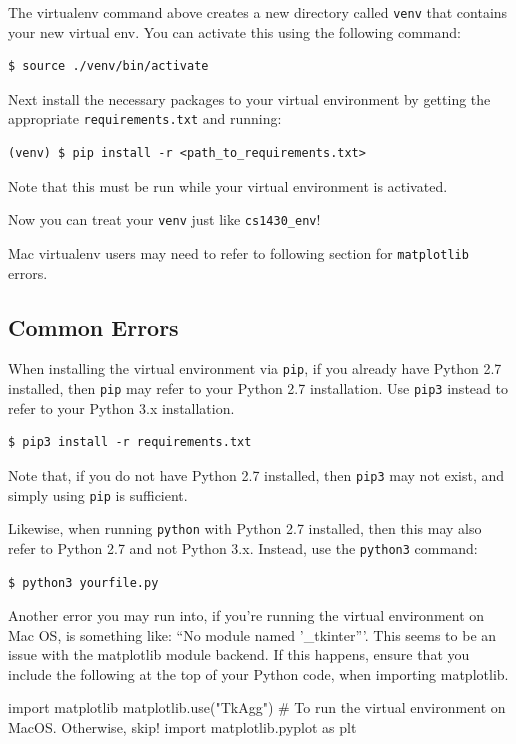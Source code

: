 \documentclass{article}
\begin{document}
The virtualenv command above creates a new directory called \texttt{venv} that contains your new virtual env. You can activate this using the following command:
\begin{verbatim}
$ source ./venv/bin/activate
\end{verbatim}

Next install the necessary packages to your virtual environment by getting the appropriate \texttt{requirements.txt} and running:
\begin{verbatim}
(venv) $ pip install -r <path_to_requirements.txt>
\end{verbatim}

Note that this must be run while your virtual environment is activated.

Now you can treat your \texttt{venv} just like \texttt{cs1430\_env}!

Mac virtualenv users may need to refer to following section for \texttt{matplotlib} errors.

\subsection{Common Errors}
When installing the virtual environment via \texttt{pip}, if you already have Python 2.7 installed, then \texttt{pip} may refer to your Python 2.7 installation. Use \texttt{pip3} instead to refer to your Python 3.x installation.
\begin{verbatim}
$ pip3 install -r requirements.txt
\end{verbatim}
Note that, if you do not have Python 2.7 installed, then \texttt{pip3} may not exist, and simply using \texttt{pip} is sufficient.

Likewise, when running \texttt{python} with Python 2.7 installed, then this may also refer to Python 2.7 and not Python 3.x. Instead, use the \texttt{python3} command:
\begin{verbatim}
$ python3 yourfile.py
\end{verbatim}

Another error you may run into, if you're running the virtual environment on Mac OS, is something like: ``No module named '\_tkinter'''. This seems to be an issue with the matplotlib module backend. If this happens, ensure that you include the following at the top of your Python code, when importing matplotlib. 
\begin{python}
import matplotlib
matplotlib.use("TkAgg") # To run the virtual environment on MacOS. Otherwise, skip!
import matplotlib.pyplot as plt
\end{python}
\end{document}
